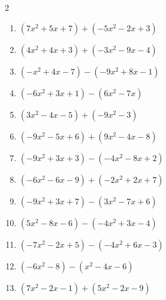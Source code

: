 \begin{multicols}{2}
\begin{enumerate}

  \item $(7x^{2}+5x+7)+(-5x^{2}-2x+3)$


  \item $(4x^{2}+4x+3)+(-3x^{2}-9x-4)$


  \item $(-x^{2}+4x-7)-(-9x^{2}+8x-1)$


\columnbreak %

  \item $(-6x^{2}+3x+1)-(6x^{2}-7x)$


  \item $(3x^{2}-4x-5)+(-9x^{2}-3)$


  \item $(-9x^{2}-5x+6)+(9x^{2}-4x-8)$

        \phantom{$=-9x-2$}

  \item $(-9x^{2}+3x+3)-(-4x^{2}-8x+2)$


  \item $(-6x^{2}-6x-9)+(-2x^{2}+2x+7)$


  \item $(-9x^{2}+3x+7)-(3x^{2}-7x+6)$


  \item $(5x^{2}-8x-6)-(-4x^{2}+3x-4)$


  \item $(-7x^{2}-2x+5)-(-4x^{2}+6x-3)$


  \item $(-6x^{2}-8)-(x^{2}-4x-6)$


  \item $(7x^{2}-2x-1)+(5x^{2}-2x-9)$



\end{enumerate}
\end{multicols}
